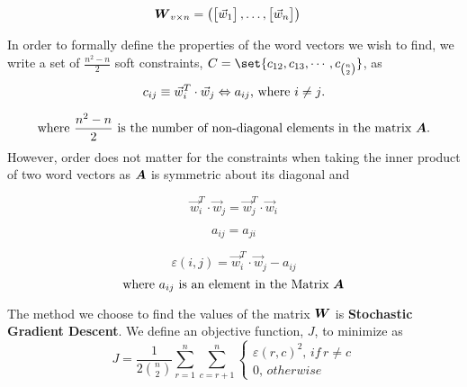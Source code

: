 \documentclass{article}
\begin{document}
  \begin{align*}
    \boldsymbol{{W}}_{{v} \times {n}} &= \begin{pmatrix}
    	\begin{bmatrix} \vec{w}_{1} \end{bmatrix} , \ldots , \begin{bmatrix} \vec{w}_{n}\end{bmatrix}
	 \end{pmatrix}
  \end{align*}

In order to formally define the properties of the word vectors we wish to find, we write a set of $\frac{n^2 - n}{2}$ soft constraints, $C = \set{c_{12},c_{13},\cdots ,c_{n \choose 2}}$, as
\begin{equation*}
c_{ij} \equiv \vec{w}_{i}^T \cdot \vec{w}_{j} \logeq a_{ij} \text{, where $i \neq j$.}
\end{equation*}

\begin{equation*}
\text{where } \frac{n^2 - n}{2} \text{ is the number of non-diagonal elements in the matrix } \boldsymbol{A}.
\end{equation*}
However, order does not matter for the constraints when taking the inner product of two word vectors as $\boldsymbol{A}$ is symmetric about its diagonal and 

\begin{equation*}
\vec{w}_{i}^T \cdot \vec{w}_{j} = \vec{w}_{j}^T \cdot \vec{w}_{i}
\end{equation*}

\begin{equation*}
a_{ij} = a_{ji}
\end{equation*}


\begin{equation*}
\varepsilon(i,j) = \vec{w}_{i}^T \cdot \vec{w}_{j} - a_{ij}
\end{equation*}
\begin{equation*}
\text{where $a_{ij}$ is an element in the Matrix $\boldsymbol{A}$}
\end{equation*}

The method we choose to find the values of the matrix $\boldsymbol{W}$ is \textbf{Stochastic Gradient Descent}. We define an objective function, $J$, to minimize as
\begin{equation*}
J = \frac{1}{2 {n \choose 2} } \sum_{r=1}^{n}{\sum_{c=r+1}^{n}{
\begin{cases}
\varepsilon(r,c)^2, \, if \, r \neq c
\\
0, \, otherwise
\end{cases}
}}
\end{equation*}
\end{document}
